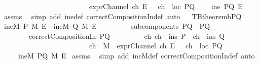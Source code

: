 \begin{isabellebody}
\ \ \ \ \ \ \ \ \ \ \ \ \ \ \ \ \ \ \ \ \ \ \ \ \ {\isacharparenleft}exprChannel\ ch\ E{\isacharparenright}\ {\isasymand}\ \ {\isacharparenleft}ch\ {\isasymnotin}\ {\isacharparenleft}loc\ PQ{\isacharparenright}{\isacharparenright}{\isacharparenright}{\isachardoublequoteclose}\isanewline
{}\ \ \ \ {\isachardoublequoteopen}ine\ PQ\ E{\isachardoublequoteclose}\isanewline
%
\isadelimproof
%
\endisadelimproof
%
\isatagproof
{}\isamarkupfalse%
\ assms\ \isamarkupfalse%
\ {\isacharparenleft}simp\ add{\isacharcolon}\ ine{\isacharunderscore}def\ correctCompositionIn{\isacharunderscore}def{\isacharcomma}\ auto{\isacharparenright}%
\endisatagproof
{\isafoldproof}%
%
\isadelimproof
\ \isanewline
%
\endisadelimproof
\isanewline
{}\isamarkupfalse%
\ TBtheorem{}b{\isacharunderscore}PQ{\isacharcolon}\isanewline
{}\ {\isachardoublequoteopen}{\isacharparenleft}ineM\ P\ M\ E{\isacharparenright}\ {\isasymor}\ {\isacharparenleft}ineM\ Q\ M\ E{\isacharparenright}{\isachardoublequoteclose}\ \isanewline
\ \ \ \ \ \ \ \ {\isachardoublequoteopen}subcomponents\ PQ\ {\isacharequal}\ {\isacharbraceleft}P{\isacharcomma}Q{\isacharbraceright}{\isachardoublequoteclose}\isanewline
\ \ \ \ \ \ \ \ {\isachardoublequoteopen}correctCompositionIn\ PQ{\isachardoublequoteclose}\isanewline
\ \ \ \ \ \ \ \ {\isachardoublequoteopen}{\isasymexists}\ ch{\isachardot}\ {\isacharparenleft}{\isacharparenleft}{\isacharparenleft}ch\ {\isasymin}\ {\isacharparenleft}ins\ P{\isacharparenright}{\isacharparenright}\ {\isasymor}\ {\isacharparenleft}ch\ {\isasymin}\ {\isacharparenleft}ins\ Q{\isacharparenright}\ {\isacharparenright}{\isacharparenright}\ {\isasymand}\ \isanewline
\ \ \ \ \ \ \ \ \ \ \ \ \ \ \ \ \ \ \ \ \ \ \ \ \ {\isacharparenleft}ch\ {\isasymin}\ M{\isacharparenright}\ {\isasymand}\ {\isacharparenleft}exprChannel\ ch\ E{\isacharparenright}\ {\isasymand}\ \ {\isacharparenleft}ch\ {\isasymnotin}\ {\isacharparenleft}loc\ PQ{\isacharparenright}{\isacharparenright}{\isacharparenright}{\isachardoublequoteclose}\isanewline
{}\ \ \ \ \ {\isachardoublequoteopen}ineM\ PQ\ M\ E{\isachardoublequoteclose}\isanewline
%
\isadelimproof
%
\endisadelimproof
%
\isatagproof
{}\isamarkupfalse%
\ assms\ \isamarkupfalse%
\ {\isacharparenleft}simp\ add{\isacharcolon}\ ineM{\isacharunderscore}def\ correctCompositionIn{\isacharunderscore}def{\isacharcomma}\ auto{\isacharparenright}%
\endisatagproof
{\isafoldproof}%
%
\isadelimproof
\ \isanewline

\end{isabellebody}
